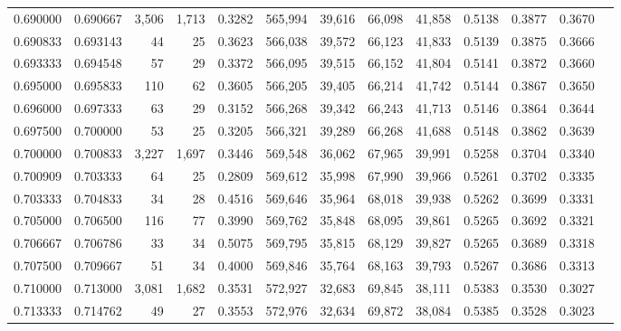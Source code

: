\begin{tabular}{rrrrrrrrrrrrr}
0.690000 & 0.690667 &  3,506 & 1,713 &                                     0.3282 & 565,994 &  39,616 &  66,098 &  41,858 & 0.5138 & 0.3877 & 0.3670 \\
0.690833 & 0.693143 &     44 &    25 &                                     0.3623 & 566,038 &  39,572 &  66,123 &  41,833 & 0.5139 & 0.3875 & 0.3666 \\
0.693333 & 0.694548 &     57 &    29 &                                     0.3372 & 566,095 &  39,515 &  66,152 &  41,804 & 0.5141 & 0.3872 & 0.3660 \\
0.695000 & 0.695833 &    110 &    62 &                                     0.3605 & 566,205 &  39,405 &  66,214 &  41,742 & 0.5144 & 0.3867 & 0.3650 \\
0.696000 & 0.697333 &     63 &    29 &                                     0.3152 & 566,268 &  39,342 &  66,243 &  41,713 & 0.5146 & 0.3864 & 0.3644 \\
0.697500 & 0.700000 &     53 &    25 &                                     0.3205 & 566,321 &  39,289 &  66,268 &  41,688 & 0.5148 & 0.3862 & 0.3639 \\
0.700000 & 0.700833 &  3,227 & 1,697 &                                     0.3446 & 569,548 &  36,062 &  67,965 &  39,991 & 0.5258 & 0.3704 & 0.3340 \\
0.700909 & 0.703333 &     64 &    25 &                                     0.2809 & 569,612 &  35,998 &  67,990 &  39,966 & 0.5261 & 0.3702 & 0.3335 \\
0.703333 & 0.704833 &     34 &    28 &                                     0.4516 & 569,646 &  35,964 &  68,018 &  39,938 & 0.5262 & 0.3699 & 0.3331 \\
0.705000 & 0.706500 &    116 &    77 &                                     0.3990 & 569,762 &  35,848 &  68,095 &  39,861 & 0.5265 & 0.3692 & 0.3321 \\
0.706667 & 0.706786 &     33 &    34 &                                     0.5075 & 569,795 &  35,815 &  68,129 &  39,827 & 0.5265 & 0.3689 & 0.3318 \\
0.707500 & 0.709667 &     51 &    34 &                                     0.4000 & 569,846 &  35,764 &  68,163 &  39,793 & 0.5267 & 0.3686 & 0.3313 \\
0.710000 & 0.713000 &  3,081 & 1,682 &                                     0.3531 & 572,927 &  32,683 &  69,845 &  38,111 & 0.5383 & 0.3530 & 0.3027 \\
0.713333 & 0.714762 &     49 &    27 &                                     0.3553 & 572,976 &  32,634 &  69,872 &  38,084 & 0.5385 & 0.3528 & 0.3023 \\

\end{tabular}

